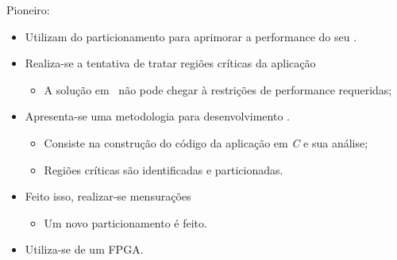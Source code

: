   \begin{frame}{Pioneiro: \cite{Edwards1994}} \vspace{-1em}
      \begin{itemize}
         \setlength{\itemsep}{1.3em}
         \item Utilizam do particionamento para aprimorar a performance do seu \software. 
         \item Realiza-se a tentativa de tratar regiões críticas da aplicação 
         \begin{itemize}
            \item A solução em \software\ não pode chegar à restrições de performance requeridas;
         \end{itemize}
      
         \item Apresenta-se uma metodologia para desenvolvimento \codesign.
         \begin{itemize}
            \setlength{\itemsep}{1.0em}
            \item Consiste na construção do código da aplicação em \textit{C} e sua análise;
            \item Regiões críticas são identificadas e particionadas. 
         \end{itemize}
      
         \item Feito isso, realizar-se mensurações
         \begin{itemize}
            \item  Um novo particionamento é feito.
         \end{itemize}
      
         \item Utiliza-se de um FPGA.
      \end{itemize}
   \end{frame}

